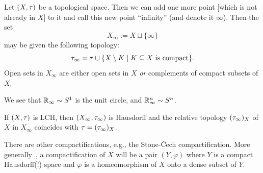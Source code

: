 \begin{node}
Let $(X,\tau)$ be a topological space. Then we can add one more point
[which is not already in $X$] to it
and call this new point ``infinity'' (and denote it $\infty$). Then
the set
\begin{equation}
X_{\infty}:=X\sqcup\{\infty\}
\end{equation}
may be given the following topology:
\begin{equation}
\tau_{\infty}=\tau\cup\{X\setminus K\mid K\subseteq X\mbox{ is compact}\}.
\end{equation}
Open sets in $X_{\infty}$ are either open sets in $X$ \emph{or}
complements of compact subsets of $X$.
\end{node}

\begin{example}
We see that $\mathbb{R}_{\infty}\sim S^{1}$ is the unit circle, and
$\mathbb{R}^{n}_{\infty}\sim S^{n}$.
\end{example}

\begin{claim}
If $(X,\tau)$ is LCH, then $(X_{\infty},\tau_{\infty})$ is Hausdorff and the relative
topology $(\tau_{\infty})_{X}$ of $X$ in $X_{\infty}$ coincides with
$\tau=(\tau_{\infty})_{X}$. 
\end{claim}

\begin{remark}
There are other compactifications, e.g., the Stone-\v{C}ech
compactification. More generally~\cite[p.144]{folland1999real}, a compactification of $X$ will be a
pair $(Y,\varphi)$ where $Y$ is a compact Hausdorff(!) space and
$\varphi$ is a homeomorphism of $X$ onto a dense subset of $Y$.
\end{remark}